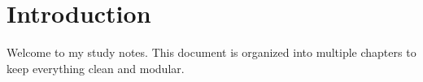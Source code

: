 \section{Introduction}

Welcome to my study notes. This document is organized into multiple chapters
to keep everything clean and modular.
